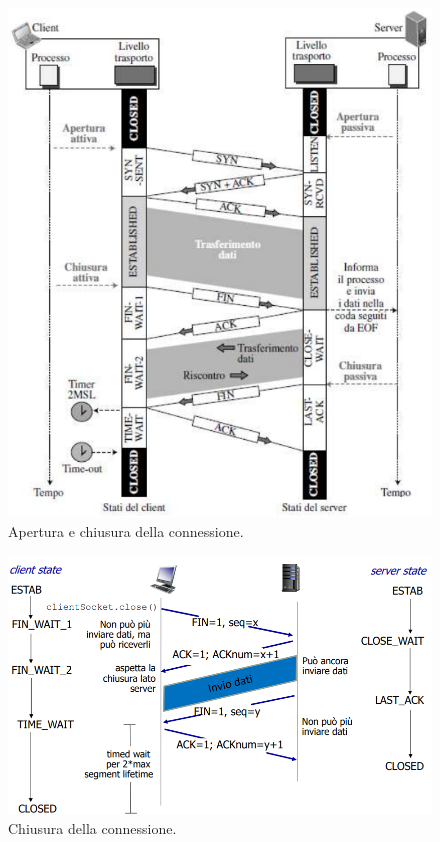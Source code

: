 \documentclass[11pt, italian, openany]{book}
\begin{document}
\begin{sloppypar}
\begin{figure}[!h]
	\centering
	\includegraphics[scale=0.55]{images/tcp-apertura-chiusura.png}
	\caption{Apertura e chiusura della connessione.}
	\label{fig:tcp-apertura-chiusura}
\end{figure}

\pagebreak

\begin{figure}[!h]
	\centering
	\includegraphics[scale=0.45]{images/tcp-chiusura.png}
	\caption{Chiusura della connessione.}
	\label{fig:tcp-chiusura}
\end{figure}


\end{sloppypar}
\end{document}

